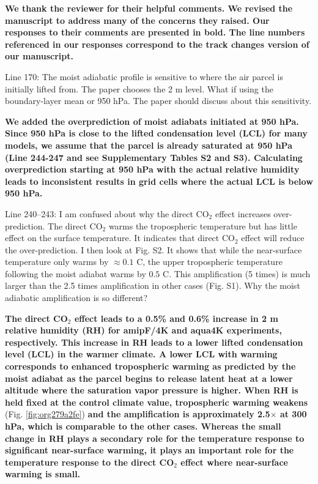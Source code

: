\documentclass[11pt]{article}
\begin{document}
\textbf{We thank the reviewer for their helpful comments. We revised the manuscript to address many of the concerns they raised. Our responses to their comments are presented in bold. The line numbers referenced in our responses correspond to the track changes version of our manuscript.}

Line 170: The moist adiabatic profile is sensitive to where the air parcel is initially lifted from. The paper chooses the 2 m level. What if using the boundary-layer mean or 950 hPa. The paper should discuss about this sensitivity.

\textbf{We added the overprediction of moist adiabats initiated at 950 hPa. Since 950 hPa is close to the lifted condensation level (LCL) for many models, we assume that the parcel is already saturated at 950 hPa (Line 244-247 and see Supplementary Tables S2 and S3). Calculating overprediction starting at 950 hPa with the actual relative humidity leads to inconsistent results in grid cells where the actual LCL is below 950 hPa.}

Line 240--243: I am confused about why the direct CO\(_2\) effect increases over-prediction. The direct CO\(_2\) warms the tropospheric temperature but has little effect on the surface temperature. It indicates that direct CO\(_2\) effect will reduce the over-prediction. I then look at Fig. S2. It shows that while the near-surface temperature only warms by \(\approx0.1\) C, the upper tropospheric temperature following the moist adiabat warms by \(0.5\) C. This amplification (5 times) is much larger than the 2.5 times amplification in other cases (Fig. S1). Why the moist adiabatic amplification is so different?

\textbf{The direct CO\(_2\) effect leads to a 0.5\% and 0.6\% increase in 2 m relative humidity (RH) for amipF/4K and aqua4K experiments, respectively. This increase in RH leads to a lower lifted condensation level (LCL) in the warmer climate. A lower LCL with warming corresponds to enhanced tropospheric warming as predicted by the moist adiabat as the parcel begins to release latent heat at a lower altitude where the saturation vapor pressure is higher. When RH is held fixed at the control climate value, tropospheric warming weakens }(Fig. \ref{fig:org279a2fe})\textbf{ and the amplification is approximately 2.5\(\times\) at 300 hPa, which is comparable to the other cases. Whereas the small change in RH plays a secondary role for the temperature response to significant near-surface warming, it plays an important role for the temperature response to the direct CO\(_2\) effect where near-surface warming is small.}
\end{document}
